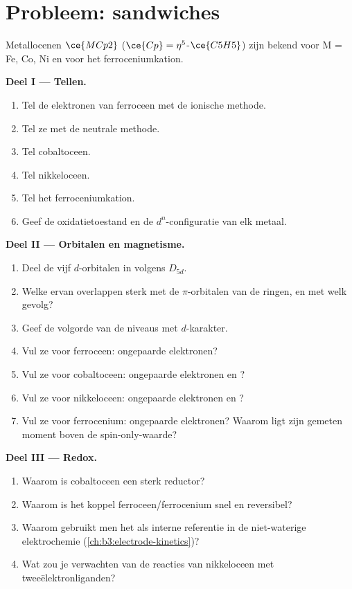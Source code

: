 \section{Probleem: sandwiches}

\begin{problem}
\label{pb:b3:organometallic-bonding:1}
Metallocenen $\ce{MCp2}$ ($\ce{Cp} = \eta^5$-$\ce{C5H5}$) zijn bekend voor M = Fe, Co, Ni en voor het ferroceniumkation.

\medskip\noindent\textbf{Deel I --- Tellen.}
\begin{enumerate}
  \item Tel de elektronen van ferroceen met de ionische methode.
  \item Tel ze met de neutrale methode.
  \item Tel cobaltoceen.
  \item Tel nikkeloceen.
  \item Tel het ferroceniumkation.
  \item Geef de oxidatietoestand en de $d^n$-configuratie van elk metaal.
\end{enumerate}

\medskip\noindent\textbf{Deel II --- Orbitalen en magnetisme.}
\begin{enumerate}[resume]
  \item Deel de vijf $d$-orbitalen in volgens $D_{5d}$.
  \item Welke ervan overlappen sterk met de $\pi$-orbitalen van de ringen, en met welk
        gevolg?
  \item Geef de volgorde van de niveaus met $d$-karakter.
  \item Vul ze voor ferroceen: ongepaarde elektronen?
  \item Vul ze voor cobaltoceen: ongepaarde elektronen en ?
  \item Vul ze voor nikkeloceen: ongepaarde elektronen en ?
  \item Vul ze voor ferrocenium: ongepaarde elektronen? Waarom ligt zijn
        gemeten moment boven de spin-only-waarde?
\end{enumerate}

\medskip\noindent\textbf{Deel III --- Redox.}
\begin{enumerate}[resume]
  \item Waarom is cobaltoceen een sterk reductor?
  \item Waarom is het koppel ferroceen/ferrocenium snel en reversibel?
  \item Waarom gebruikt men het als interne referentie in de niet-waterige
        elektrochemie
        (\cref{ch:b3:electrode-kinetics})?
  \item Wat zou je verwachten van de reacties van nikkeloceen met
        tweeëlektronliganden?
\end{enumerate}


\end{problem}
